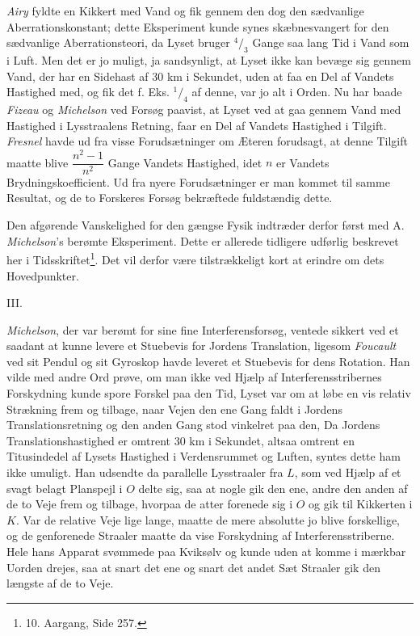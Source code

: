 \documentclass[12pt,a4paper]{article}
\newcommand{\opage}[1]{\marginnote{\footnotesize\textit{[#1]}}}
\begin{document}
\emph{Airy} fyldte en Kikkert med Vand og fik gennem den dog den sædvanlige
Aberrationskonstant; dette Eksperiment kunde synes skæbnesvangert for den
sædvanlige Aberrationsteori, da Lyset bruger $^{4}\!/_{3}$ Gange saa lang Tid
i Vand som i Luft. Men det er jo muligt, ja sandsynligt, at Lyset ikke kan
bevæge sig gennem Vand, der har en Sidehast af 30 km i Sekundet, uden at faa
en Del af Vandets Hastighed med, og fik det f. Eks. $^{1}\!/_{4}$ af denne,
var jo alt i Orden. Nu har baade \emph{Fizeau} og \emph{Michelson} ved Forsøg
paavist, at Lyset ved at gaa gennem Vand med Hastighed i Lysstraalens Retning,
faar en Del af Vandets Hastighed i Tilgift. \emph{Fresnel} havde ud fra visse
Forudsætninger om Æteren forudsagt, at denne Tilgift maatte blive
$\dfrac{n^{2}-1}{n^{2}}$ Gange Vandets Hastighed, idet $n$ er Vandets
Brydningskoefficient. Ud fra nyere Forudsætninger er man kommet til samme
Resultat, og de to Forskeres Forsøg bekræftede fuldstændig dette.

Den afgørende Vanskelighed for den gængse Fysik indtræder derfor først med
A. \emph{Michelson}'s berømte Eksperiment. Dette er allerede tidligere
udførlig beskrevet her i Tidsskriftet\footnote{10. Aargang, Side 257.}. Det
vil derfor være tilstrækkeligt kort at erindre om dets Hovedpunkter.

\begin{center}
III.
\end{center}

\emph{Michelson}, der var berømt for sine fine Interferensforsøg, ventede
sikkert ved et saadant at kunne levere et Stuebevis for Jordens Translation,
ligesom \emph{Foucault} ved sit Pendul og sit Gyroskop havde leveret et
Stuebevis for dens Rotation. Han vilde med andre Ord prøve, om man ikke ved
Hjælp af Interferensstribernes Forskydning kunde spore Forskel paa den Tid,
Lyset var om at løbe en vis relativ Strækning frem og tilbage, naar Vejen den
ene Gang faldt i Jordens Translationsretning og den anden Gang stod vinkelret
paa den, Da Jordens Translationshastighed er omtrent 30 km i Sekundet, altsaa
omtrent en Titusindedel af Lysets Hastighed i Verdensrummet og Luften, syntes
dette ham ikke umuligt. Han udsendte
\opage{5} da parallelle Lysstraaler fra $L$, som ved Hjælp af et svagt belagt Planspejl
i $O$ delte sig, saa at nogle gik den ene, andre den anden af de to Veje frem
og tilbage, hvorpaa de atter forenede sig i $O$ og gik til Kikkerten i $K$.
Var de relative Veje lige lange, maatte de mere absolutte jo blive
forskellige, og de genforenede Straaler maatte da vise Forskydning af
Interferensstriberne. Hele hans Apparat svømmede paa Kviksølv og kunde uden at
komme i mærkbar Uorden drejes, saa at snart det ene og snart det andet Sæt
Straaler gik den længste af de to Veje.
\end{document}
